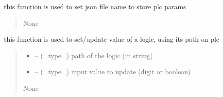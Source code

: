 \documentclass[letterpaper,10pt,english]{sphinxmanual}
\begin{document}
\begin{savenotes}
\begin{fulllineitems}

\begin{savenotes}\begin{fulllineitems}
\label{\detokenize{setting/backend/plc_managment:oxin.backend.plc_managment.management.set_file_name}}
\pysigstartsignatures
{}
\pysigstopsignatures
\sphinxAtStartPar
this function is used to set json file name to store plc params
\begin{quote}\begin{description}
\sphinxAtStartPar
None

\end{description}\end{quote}

\end{fulllineitems}\end{savenotes}


\begin{savenotes}\begin{fulllineitems}
\label{\detokenize{setting/backend/plc_managment:oxin.backend.plc_managment.management.set_value}}
\pysigstartsignatures
{}
\pysigstopsignatures
\sphinxAtStartPar
this function is used to set/update value of a logic, using its path on plc
\begin{quote}\begin{description}
\begin{itemize}
\item {} 
\sphinxAtStartPar
{} – (\_type\_) path of the logic (in string)

\item {} 
\sphinxAtStartPar
{} – (\_type\_) input value to update (digit or boolean)

\end{itemize}

\sphinxAtStartPar
None


\end{description}
\end{quote}
\end{fulllineitems}
\end{savenotes}
\end{fulllineitems}
\end{savenotes}
\end{document}

